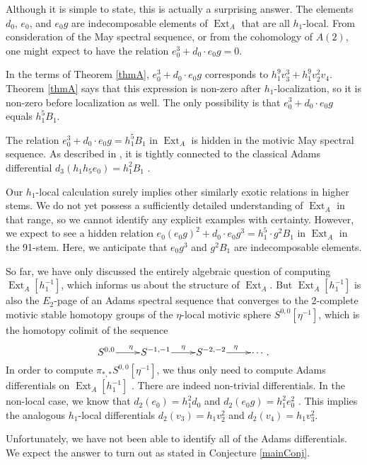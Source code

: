 \documentclass[10pt]{amsart}
\begin{document}
Although it is simple to state, this is actually a surprising answer.
The elements $d_0$, $e_0$, and $e_0 g$ are indecomposable
elements of $\operatorname{Ext}_A$ that are all $h_1$-local.  From consideration of the
May spectral sequence, or from the cohomology of $A(2)$, one might
expect to have the relation $e_0^3 + d_0 \cdot e_0 g = 0$.

In the terms of Theorem \ref{thmA}, $e_0^3 + d_0 \cdot e_0 g$
corresponds to $h_1^9 v_3^3 + h_1^9 v_2^2 v_4$.  Theorem \ref{thmA} says that
this expression is non-zero after $h_1$-localization, so it is
non-zero before localization as well.
The only possibility is that 
$e_0^3 + d_0 \cdot e_0 g$ equals $h_1^5 B_1$.

The relation $e_0^3 + d_0 \cdot e_0 g = h_1^5 B_1$ 
in $\operatorname{Ext}_A$ is hidden
in the motivic May spectral sequence.  As described in \cite{Istems},
it is tightly 
connected to the classical Adams differential $d_3(h_1 h_5 e_0) = h_1^2 B_1$
\cite[Corollary 3.6]{BJM}.

Our $h_1$-local calculation surely implies
other similarly exotic relations in higher stems.  We do not yet possess a
sufficiently detailed understanding of $\operatorname{Ext}_A$ in that range, so we cannot
identify any explicit examples with certainty.  However, we expect to see a 
hidden relation $e_0 (e_0 g)^2 + d_0 \cdot e_0 g^3 = h_1^5 \cdot g^2 B_1$
in $\operatorname{Ext}_A$ in the 91-stem.  Here, we anticipate that $e_0 g^3$ and $g^2 B_1$
are indecomposable elements.

So far, we have only discussed the entirely algebraic question of computing
$\operatorname{Ext}_A[h_1^{-1}]$, which informs us about the structure of $\operatorname{Ext}_A$.
But $\operatorname{Ext}_A[h_1^{-1}]$ is also 
the $E_2$-page of an Adams spectral sequence that converges to the
$2$-complete motivic stable homotopy groups of the $\eta$-local motivic sphere
$S^{0,0}[\eta^{-1}]$, which is the homotopy colimit of the sequence
\[
\xymatrix@1{
S^{0,0} \ar[r]^\eta & 
S^{-1,-1} \ar[r]^\eta &
S^{-2,-2} \ar[r]^\eta &
\cdots.
}
\]
In order to compute $\pi_{*,*} S^{0,0}[\eta^{-1}]$,
we thus only need to compute Adams differentials on $\operatorname{Ext}_A[h_1^{-1}]$ .
There are indeed non-trivial differentials.
In the non-local case, we know that 
$d_2(e_0) = h_1^2 d_0$ and
$d_2(e_0 g) = h_1^2 e_0^2$ \cite{Istems}.
This implies the analogous $h_1$-local differentials
$d_2(v_3) = h_1 v_2^2$ and
$d_2(v_4) = h_1 v_3^2$.

Unfortunately, we have not been able to identify all of the Adams differentials.
We expect the answer to turn out as stated in Conjecture \ref{mainConj}.
\end{document}
